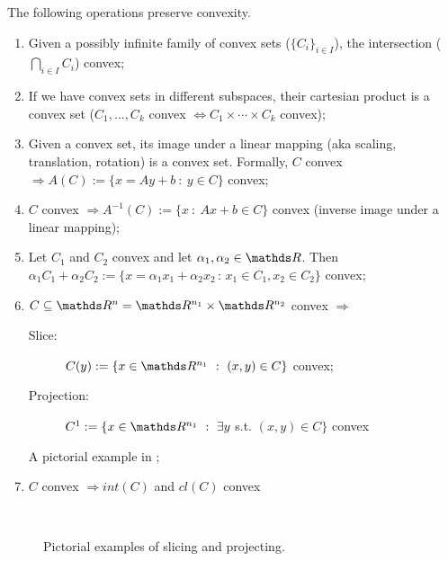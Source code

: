 \documentclass[ComputationalMathematics.tex]{subfiles}
\begin{document}
\begin{proposition}
The following operations preserve convexity.
\begin{enumerate}
  \item Given a possibly infinite family of convex sets (${\{C_i\}}_{i \in I}$), the intersection ($\bigcap_{i \in I} C_i$) convex;
  
  \item If we have convex sets in different subspaces, their cartesian product is a convex set ($C_1, \ldots, C_k$ convex $\iff C_1 \times \cdots \times C_k$ convex);
  
  \item Given a convex set, its image under a linear mapping (aka scaling, translation, rotation) is a convex set. Formally, $C$ convex $\Longrightarrow A(C) := \{x = Ay + b~:~y \in C\}$ convex; 
  
  \item $C$ convex $\Longrightarrow A^{-1}(C) := \{x~:~Ax + b \in C\}$ convex (inverse image under a linear mapping);
  
  \item Let $C_1$ and $C_2$ convex and let $\alpha_1, \alpha_2 \in \R$. Then $\alpha_1 C_1 + \alpha_2 C_2 := \{ x = \alpha_1 x_1 + \alpha_2 x_2 \,:\, x_1 \in C_1, x_2 \in C_2\}$ convex;
  \item $C \subseteq \R^n = \R^{n_1} \times \R^{n_2}$ convex $\Longrightarrow$
  \begin{description}
    \item[{\small \sc Slice:}] $C(y) := \{x \in \R^{n_1}~:~(x, y) \in C\}$ convex;
    \item[{\small \sc Projection:}] $C^1 := \{x \in \R^{n_1}~:~\exists y$ s.t. $(x, y) \in C\}$ convex
  \end{description}
    A pictorial example in ;
  \item $C$ convex $\Longrightarrow int(C)$ and $cl(C)$ convex
\end{enumerate}
\end{proposition}

\begin{figure}[h]
  \centering
  \hspace{0.5cm}
  \\
  \caption{Pictorial examples of slicing and projecting.}\label{fig:5ott_3}
\end{figure}
\end{document}
